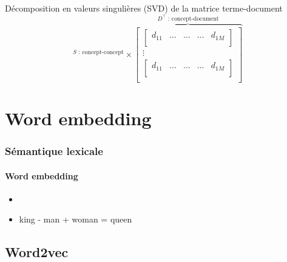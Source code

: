 \documentclass[xcolor=table]{beamer}
\begin{document}
\begin{frame}
\begin{block}{Décomposition en valeurs singulières (SVD) de la matrice terme-document}
\[{		}^{S \text{ : concept-concept}}
		\times 
		\overbrace{
			\begin{bmatrix}
			\begin{bmatrix}
			d_{11} & \ldots & \ldots & \ldots & d_{1M} \\
			\end{bmatrix}\\
			\vdots \\
			\begin{bmatrix}
			d_{11} & \ldots & \ldots & \ldots & d_{1M} \\
			\end{bmatrix}\\
			\end{bmatrix}
		}^{D^\top \text{ : concept-document}}
		\]
		
	\end{block}
	
\end{frame}


\section{Word embedding}

\begin{frame}
\frametitle{Sémantique lexicale}
\framesubtitle{Word embedding}

\begin{itemize}
	\item 
	\item king - man + woman = queen
\end{itemize}

\end{frame}


\subsection{Word2vec}
\end{document}
